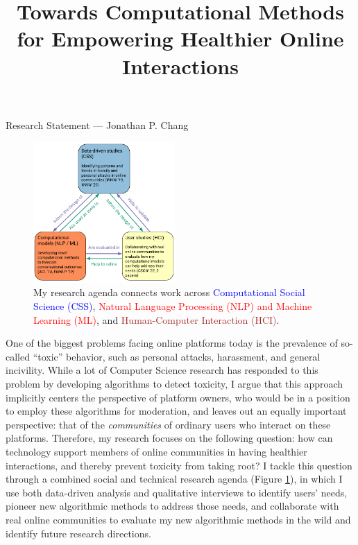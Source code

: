 \documentclass[12pt,letterpaper]{article}
\title{Towards Computational Methods for Empowering Healthier Online Interactions}
\newcommand\introclosing\laresearchintro
\newcommand\introclosing\genresearchintro
\begin{document}
\maketitle

{\centering Research Statement --- Jonathan P. Chang \par}

\vspace{0.5\baselineskip}

\begin{figure}
\centering
\includegraphics[width=0.48\textwidth]{FIG/the-circle-of-life.pdf}
\caption{My research agenda connects work across \textcolor{blue}{Computational Social Science (CSS)}, \textcolor{red}{Natural Language Processing (NLP) and Machine Learning (ML)}, and \textcolor{brown}{Human-Computer Interaction (HCI)}.}
\label{fig:research_overview}
\end{figure}

One of the biggest problems facing online platforms today is the prevalence of so-called ``toxic'' behavior, such as personal attacks, harassment, and general incivility.
While a lot of Computer Science research has responded to this problem by developing algorithms to detect toxicity, I argue that this approach implicitly centers the perspective of platform owners, who would be in a position to employ these algorithms for moderation, and leaves out an equally important perspective: that of the \emph{communities} of ordinary users who interact on these platforms.
Therefore, my research focuses on the following question: how can technology support members of online communities in having healthier interactions, and thereby prevent toxicity from taking root?
I tackle this question through a combined social and technical research agenda (Figure \ref{fig:research_overview}), in which I use both data-driven analysis and qualitative interviews to identify users' needs, pioneer new algorithmic methods to address those needs, and collaborate with real online communities to evaluate my new algorithmic methods in the wild and identify future research directions.
\introclosing
\end{document}
